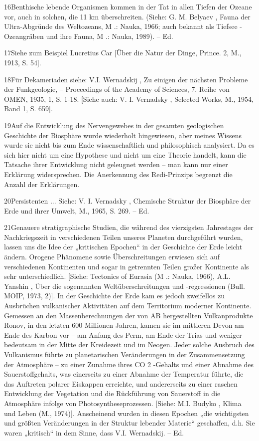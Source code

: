 \documentclass[11pt,a4paper]{book}
\begin{document}
16Benthische lebende Organismen kommen in der Tat in allen Tiefen der Ozeane vor, auch in solchen, die 11 km überschreiten. (Siehe: G. M. Belyaev , Fauna der Ultra-Abgründe des Weltozeans, M .: Nauka, 1966; auch bekannt als Tiefsee -Ozeangräben und ihre Fauna, M .: Nauka, 1989). -- Ed.



17Siehe zum Beispiel Lucretius Car [Über die Natur der Dinge, Prince. 2, M., 1913, S. 54].



18Für Dekameriaden siehe: V.I. Wernadskij , Zu einigen der nächsten Probleme der Funkgeologie, -- Proceedings of the Academy of Sciences, 7. Reihe von OMEN, 1935, 1, S. 1-18. [Siehe auch: V. I. Vernadsky , Selected Works, M., 1954, Band 1, S. 659].



19Auf die Entwicklung des Nervengewebes in der gesamten geologischen Geschichte der Biosphäre wurde wiederholt hingewiesen, aber meines Wissens wurde sie nicht bis zum Ende wissenschaftlich und philosophisch analysiert. Da es sich hier nicht um eine Hypothese und nicht um eine Theorie handelt, kann die Tatsache ihrer Entwicklung nicht geleugnet werden -- man kann nur einer Erklärung widersprechen. Die Anerkennung des Redi-Prinzips begrenzt die Anzahl der Erklärungen.



20Persistenten ... Siehe: V. I. Vernadsky , Chemische Struktur der Biosphäre der Erde und ihrer Umwelt, M., 1965, S. 269. -- Ed.



21Genauere stratigraphische Studien, die während des vierzigsten Jahrestages der Nachkriegszeit in verschiedenen Teilen unseres Planeten durchgeführt wurden, lassen uns die Idee der „kritischen Epochen“ in der Geschichte der Erde leicht ändern. Orogene Phänomene sowie Überschreitungen erwiesen sich auf verschiedenen Kontinenten und sogar in getrennten Teilen großer Kontinente als sehr unterschiedlich. [Siehe: Tectonics of Eurasia (M .: Nauka, 1966), A.L. Yanshin , Über die sogenannten Weltüberschreitungen und -regressionen (Bull. MOIP, 1973, 2)]. In der Geschichte der Erde kam es jedoch zweifellos zu Ausbrüchen vulkanischer Aktivitäten auf dem Territorium moderner Kontinente. Gemessen an den Massenberechnungen der von AB hergestellten Vulkanprodukte Ronov, in den letzten 600 Millionen Jahren, kamen sie im mittleren Devon am Ende des Karbon vor -- am Anfang des Perm, am Ende der Trias und weniger bedeutsam in der Mitte der Kreidezeit und im Neogen. Jeder solche Ausbruch des Vulkanismus führte zu planetarischen Veränderungen in der Zusammensetzung der Atmosphäre -- zu einer Zunahme ihres CO 2 -Gehalts und einer Abnahme des Sauerstoffgehalts, was einerseits zu einer Abnahme der Temperatur führte, die das Auftreten polarer Eiskappen erreichte, und andererseits zu einer raschen Entwicklung der Vegetation und die Rückführung von Sauerstoff in die Atmosphäre infolge von Photosyntheseprozessen. [Siehe: M.I. Budyko , Klima und Leben (M., 1974)]. Anscheinend wurden in diesen Epochen „die wichtigsten und größten Veränderungen in der Struktur lebender Materie“ geschaffen, d.h. Sie waren „kritisch“ in dem Sinne, dass V.I. Wernadskij. -- Ed.
\end{document}
